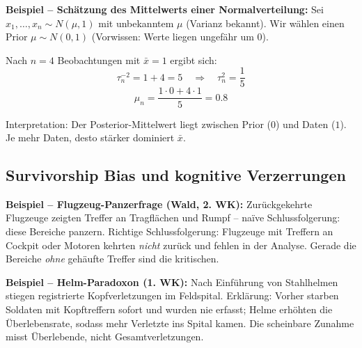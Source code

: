 \textbf{Beispiel -- Schätzung des Mittelwerts einer Normalverteilung:}
Sei $x_1,\dots,x_n \sim N(\mu,1)$ mit unbekanntem $\mu$ (Varianz bekannt).
Wir wählen einen Prior $\mu \sim N(0,1)$ (Vorwissen: Werte liegen ungefähr um 0).

Nach $n=4$ Beobachtungen mit $\bar{x}=1$ ergibt sich:
$$\tau_n^{-2} = 1 + 4 = 5 \quad \Rightarrow \quad \tau_n^2 = \frac{1}{5}$$
$$\mu_n = \frac{1\cdot 0 + 4\cdot 1}{5} = 0.8$$

Interpretation: Der Posterior-Mittelwert liegt zwischen Prior ($0$) und Daten ($1$). Je mehr Daten, desto stärker dominiert $\bar{x}$.
\newpage


\subsection{Survivorship Bias und kognitive Verzerrungen}


\textbf{Beispiel -- Flugzeug-Panzerfrage (Wald, 2. WK):} Zurückgekehrte Flugzeuge zeigten Treffer an Tragflächen und Rumpf -- naïve Schlussfolgerung: diese Bereiche panzern. Richtige Schlussfolgerung: Flugzeuge mit Treffern an Cockpit oder Motoren kehrten \emph{nicht} zurück und fehlen in der Analyse. Gerade die Bereiche \emph{ohne} gehäufte Treffer sind die kritischen.

\textbf{Beispiel -- Helm-Paradoxon (1. WK):} Nach Einführung von Stahlhelmen stiegen registrierte Kopfverletzungen im Feldspital. Erklärung: Vorher starben Soldaten mit Kopftreffern sofort und wurden nie erfasst; Helme erhöhten die Überlebensrate, sodass mehr Verletzte ins Spital kamen. Die scheinbare Zunahme misst Überlebende, nicht Gesamtverletzungen.



